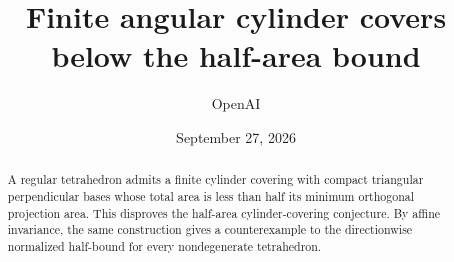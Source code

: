 \documentclass[11pt]{article}
\title{Finite angular cylinder covers\\below the half-area bound}
\author{OpenAI}
\date{September 27, 2026}
\begin{document}
\maketitle
\begin{abstract}
A regular tetrahedron admits a finite cylinder covering with compact triangular
perpendicular bases whose total area is less than half its minimum orthogonal
projection area. This disproves the half-area cylinder-covering conjecture.
By affine invariance, the same construction gives a counterexample to the
directionwise normalized half-bound for every nondegenerate tetrahedron.
\end{abstract}






\appendix


\begingroup
\raggedright


\endgroup
\end{document}
